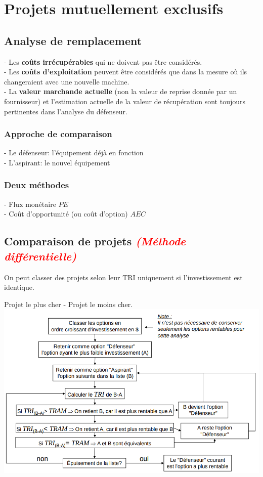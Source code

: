 \section{Projets mutuellement exclusifs}

\subsection{Analyse de remplacement}
- Les \textbf{coûts irrécupérables} qui ne doivent pas être considérés.\\
- Les \textbf{coûts d’exploitation} peuvent être considérés que dans la mesure où ils changeraient avec une nouvelle machine.\\
- La \textbf{valeur marchande actuelle} (non la valeur de reprise donnée par un fournisseur) et l’estimation actuelle de la valeur de récupération sont toujours pertinentes dans l’analyse du défenseur.

\subsubsection{Approche de comparaison}
- Le défenseur: l’équipement déjà en fonction\\
- L’aspirant: le nouvel équipement

\subsubsection{Deux méthodes}
- Flux monétaire $PE$\\
- Coût d’opportunité (ou coût d’option) $AEC$

\subsection{Comparaison de projets \textcolor{red}{\textit{(Méthode différentielle)}}}
On peut classer des projets selon leur TRI uniquement si l’investissement est identique.

Projet le plus cher - Projet le moins cher.\\

\includegraphics[scale=0.5]{images/analyse_differentielle.png}
